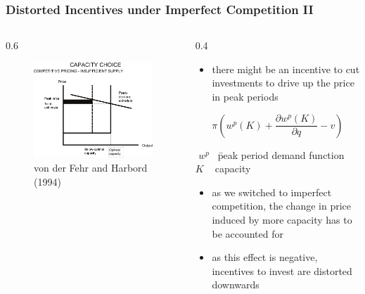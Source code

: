\begin{frame}

\frametitle{Distorted Incentives under Imperfect Competition II}
\begin{columns}
\begin{column} {0.6\textwidth}

\begin{figure}[h]
\centering
\includegraphics[width=1.\textwidth]{capacity/peak_load_insufficient}
    \caption{von der Fehr and Harbord (1994)}
\end{figure}
\end{column}

\begin{column} {0.4\textwidth}
\begin{itemize}
\item there might be an incentive to cut investments to drive up the price in peak periods
\end {itemize}

\begin{equation}
\pi (w^p(K)+\frac{\partial w^p(K)}{\partial q}-v)
\end{equation}

{\small
\begin{tabbing}
\= $w^p$ \  \= peak period demand function \\
\> $K$   \    \> capacity
\end{tabbing}}

\begin{itemize}
\item as we switched to imperfect competition, the change in price induced by more capacity has to be accounted for
\item as this effect is negative, incentives to invest are distorted downwards
\end {itemize}

\end{column}
\end{columns}
	

\end{frame}

